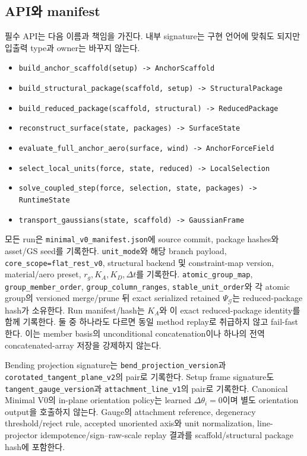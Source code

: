 \documentclass[10pt]{article}
\newcommand{\code}[1]{{\small\nolinkurl{#1}}}
\begin{document}
\subsection{API와 manifest}

필수 API는 다음 이름과 책임을 가진다. 내부 signature는 구현 언어에 맞춰도 되지만
입출력 type과 owner는 바꾸지 않는다.

\begin{itemize}
  \item \code{build\_anchor\_scaffold(setup) -> AnchorScaffold}
  \item \code{build\_structural\_package(scaffold, setup) -> StructuralPackage}
  \item \code{build\_reduced\_package(scaffold, structural) -> ReducedPackage}
  \item \code{reconstruct\_surface(state, packages) -> SurfaceState}
  \item \code{evaluate\_full\_anchor\_aero(surface, wind) -> AnchorForceField}
  \item \code{select\_local\_units(force, state, reduced) -> LocalSelection}
  \item \code{solve\_coupled\_step(force, selection, state, packages) -> RuntimeState}
  \item \code{transport\_gaussians(state, scaffold) -> GaussianFrame}
\end{itemize}

모든 run은 \code{minimal\_v0\_manifest.json}에 source commit, package hashes와
asset/GS seed를 기록한다. \code{unit\_mode}와 해당 branch payload,
\code{core\_scope=flat\_rest\_v0}, structural backend 및 constraint-map version,
material/aero preset, \(r_g,K_A,K_D,\Delta t\)를 기록한다.
\code{atomic\_group\_map}, \code{group\_member\_order},
\code{group\_column\_ranges}, \code{stable\_unit\_order}와 각 atomic group의
versioned merge/prune 뒤 exact serialized retained \(\Psi_{\mathcal G}\)는
reduced-package hash가 소유한다. Run manifest/hash는 \(K_A\)와 이 exact reduced-package
identity를 함께 기록한다. 둘 중 하나라도 다르면 동일 method replay로 취급하지 않고 fail-fast한다.
이는 member basis의 unconditional concatenation이나 하나의 전역 concatenated-array 저장을
강제하지 않는다.

Bending projection signature는 \code{bend\_projection\_version}과
\code{corotated\_tangent\_plane\_v2}의 pair로 기록한다.
Setup frame signature도 \code{tangent\_gauge\_version}과
\code{attachment\_line\_v1}의 pair로 기록한다.
Canonical Minimal V0의 in-plane orientation policy는 learned \(\Delta\theta_i=0\)이며
별도 orientation output을 호출하지 않는다.
Gauge의 attachment reference, degeneracy threshold/reject rule, accepted unoriented axis와
unit normalization, line-projector idempotence/sign--raw-scale replay 결과를
scaffold/structural package hash에 포함한다.
\end{document}

